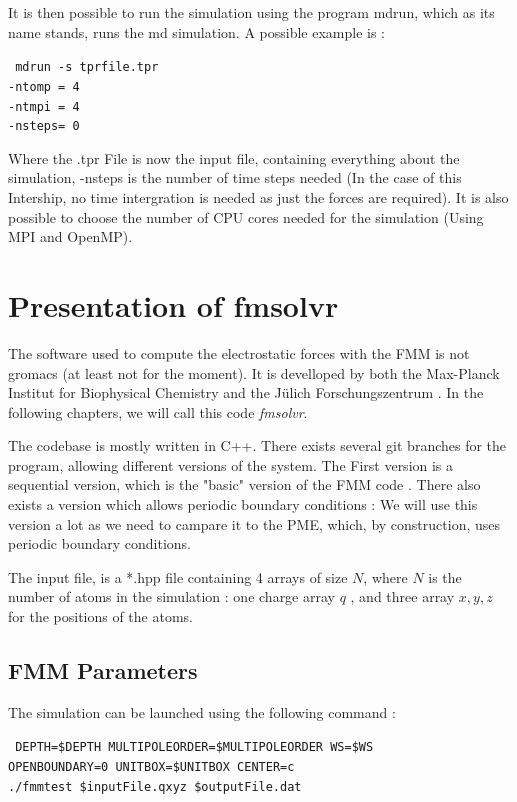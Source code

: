 \documentclass[11pt,twoside,a4paper]{report}
\begin{document}
It is then possible to run the simulation using the program mdrun, which as its name stands, runs the md simulation. A possible example is :

{\centering\tt { mdrun -s tprfile.tpr \\
				 -ntomp = 4  			\\		
				 -ntmpi = 4				 \\
				 -nsteps= 0     		  \\  
 }}
 
\vspace{5mm}

Where the .tpr File is now the input file, containing everything about the simulation, -nsteps is the number of time steps needed (In the case of this Intership, no time intergration is needed as just the forces are required). It is also possible to choose the number of CPU cores needed for the simulation (Using MPI and OpenMP).

\section{Presentation of fmsolvr}	

	The software used to compute the electrostatic forces with the FMM is not gromacs (at least not for the moment). It is develloped by both the Max-Planck Institut for Biophysical Chemistry and the Jülich Forschungszentrum . In the following chapters, we will call this code \textit{fmsolvr}. 
	
	The codebase is mostly written in C++.  There exists several git branches for the program, allowing different versions of the system.	
The First version is a sequential version, which is the "basic" version of the FMM code . There also exists a version which allows periodic boundary conditions : We will use this version a lot as we need to campare it to the PME, which, by construction, uses periodic boundary conditions.	

The input file, is a *.hpp file containing 4 arrays of size $N$, where $N$ is the number of atoms in the simulation : one charge array $q$ , and three array $x,y,z$ for the positions of the atoms.

\subsection{FMM Parameters}

The simulation can be launched using the following command : 

{\centering\tt { DEPTH=\${DEPTH}  MULTIPOLEORDER=\${MULTIPOLEORDER}  WS=\${WS} \\ 
OPENBOUNDARY=0 UNITBOX=\${UNITBOX} CENTER=c \\
./fmmtest \$inputFile.qxyz \$outputFile.dat \\					
 }}
\end{document}
